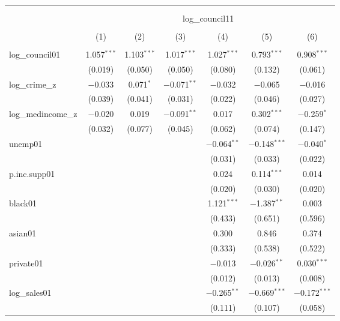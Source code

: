 
\begin{table}[!htbp] \centering 
  \caption{} 
  \label{} 
\begin{tabular}{@{\extracolsep{5pt}}lcccccc} 
\\[-1.8ex]\hline \\[-1.8ex] 
\\[-1.8ex] & \multicolumn{6}{c}{log\_council11} \\ 
\\[-1.8ex] & (1) & (2) & (3) & (4) & (5) & (6)\\ 
\hline \\[-1.8ex] 
 log\_council01 & 1.057$^{***}$ & 1.103$^{***}$ & 1.017$^{***}$ & 1.027$^{***}$ & 0.793$^{***}$ & 0.908$^{***}$ \\ 
  & (0.019) & (0.050) & (0.050) & (0.080) & (0.132) & (0.061) \\ 
  log\_crime\_z & $-$0.033 & 0.071$^{*}$ & $-$0.071$^{**}$ & $-$0.032 & $-$0.065 & $-$0.016 \\ 
  & (0.039) & (0.041) & (0.031) & (0.022) & (0.046) & (0.027) \\ 
  log\_medincome\_z & $-$0.020 & 0.019 & $-$0.091$^{**}$ & 0.017 & 0.302$^{***}$ & $-$0.259$^{*}$ \\ 
  & (0.032) & (0.077) & (0.045) & (0.062) & (0.074) & (0.147) \\ 
  unemp01 &  &  &  & $-$0.064$^{**}$ & $-$0.148$^{***}$ & $-$0.040$^{*}$ \\ 
  &  &  &  & (0.031) & (0.033) & (0.022) \\ 
  p.inc.supp01 &  &  &  & 0.024 & 0.114$^{***}$ & 0.014 \\ 
  &  &  &  & (0.020) & (0.030) & (0.020) \\ 
  black01 &  &  &  & 1.121$^{***}$ & $-$1.387$^{**}$ & 0.003 \\ 
  &  &  &  & (0.433) & (0.651) & (0.596) \\ 
  asian01 &  &  &  & 0.300 & 0.846 & 0.374 \\ 
  &  &  &  & (0.333) & (0.538) & (0.522) \\ 
  private01 &  &  &  & $-$0.013 & $-$0.026$^{**}$ & 0.030$^{***}$ \\ 
  &  &  &  & (0.012) & (0.013) & (0.008) \\ 
  log\_sales01 &  &  &  & $-$0.265$^{**}$ & $-$0.669$^{***}$ & $-$0.172$^{***}$ \\ 
  &  &  &  & (0.111) & (0.107) & (0.058) \\ 

\end{tabular}
\end{table}
